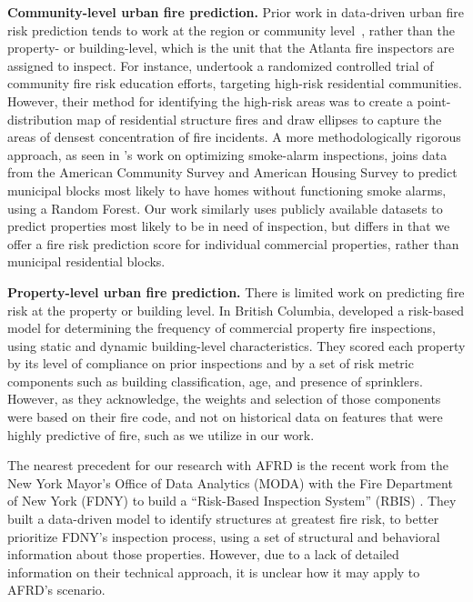 \documentclass{sig-alternate-05-2015}
\begin{document}
{\textbf{Community-level urban fire prediction.} Prior work in data-driven urban fire risk prediction tends to work at the region or community level~\cite{clare12, dacosta15}, rather than the property- or building-level, which is the unit that the Atlanta fire inspectors are assigned to inspect. For instance, \cite{clare12} undertook a randomized controlled trial of community fire risk education efforts, targeting high-risk residential communities. However, their method for identifying the high-risk areas was to create a point-distribution map of residential structure fires and draw ellipses to capture the areas of densest concentration of fire incidents. A more methodologically rigorous approach, as seen in \cite{dacosta15}'s work on optimizing smoke-alarm inspections, joins data from the American Community Survey and American Housing Survey to predict municipal blocks most likely to have homes without functioning smoke alarms, using a Random Forest. Our work similarly uses publicly available datasets to predict properties most likely to be in need of inspection, but differs in that we offer a fire risk prediction score for individual commercial properties, rather than municipal residential blocks.

\textbf{Property-level urban fire prediction.} There is limited work on predicting fire risk at the property or building level. In British Columbia, \cite{garis14} developed a risk-based model for determining the frequency of commercial property fire inspections, using static and dynamic building-level characteristics. They scored each property by its level of compliance on prior inspections and by a set of risk metric components such as building classification, age, and presence of sprinklers. However, as they acknowledge, the weights and selection of those components were based on their fire code, and not on historical data on features that were highly predictive of fire, such as we utilize in our work. 

The nearest precedent for our research with AFRD is the recent work from the New York Mayor's Office of Data Analytics (MODA) with the Fire Department of New York (FDNY) to build a ``Risk-Based Inspection System'' (RBIS) \cite{copeland15}. They built a data-driven model to identify structures at greatest fire risk, to better prioritize FDNY's inspection process, using a set of structural and behavioral information about those properties. However, due to a lack of detailed information on their technical approach, it is unclear how it may apply to AFRD's scenario.

}
\end{document}
